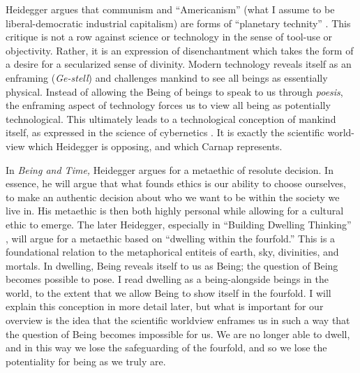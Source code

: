 \documentclass[leqno, 12pt]{turabian-researchpaper}
\begin{document}
	Heidegger argues that communism and \enquote{Americanism} (what I assume to be
	liberal-democratic industrial capitalism) are forms of \enquote{planetary technity}
	\autocite[p206]{heidegger1981}. This critique is not a row against science or technology
	in the sense of tool-use or objectivity. Rather, it is an expression of disenchantment
	which takes the form of a desire for a secularized sense of divinity. Modern
	technology reveals itself as an enframing (\textit{Ge-stell}) and challenges mankind
	to see all beings as essentially physical. Instead of allowing the Being of
	beings to speak to us through \textit{poesis}, the enframing aspect of
	technology forces us to view all being as potentially technological. This ultimately
	leads to a technological conception of mankind itself, as expressed in the
	science of cybernetics \autocite{heidegger2008c}. It is exactly the scientific
	world-view which Heidegger is opposing, and which Carnap represents.

	In \textit{Being and Time,} Heidegger argues for a metaethic of resolute
	decision. In essence, he will argue that what founds ethics is our ability to
	choose ourselves, to make an authentic decision about who we want to be within
	the society we live in. His metaethic is then both highly personal while
	allowing for a cultural ethic to emerge. The later Heidegger, especially in
	\enquote{Building Dwelling Thinking} \autocite{heidegger2008e}, will argue for
	a metaethic based on \enquote{dwelling within the fourfold.} This is a
	foundational relation to the metaphorical entiteis of earth, sky, divinities, and
	mortals. In dwelling, Being reveals itself to us as Being; the question of
	Being becomes possible to pose. I read dwelling as a being-alongside beings in
	the world, to the extent that we allow Being to show itself in the fourfold. I
	will explain this conception in more detail later, but what is important for
	our overview is the idea that the scientific worldview enframes us in such a
	way that the question of Being becomes impossible for us. We are no longer able
	to dwell, and in this way we lose the safeguarding of the fourfold, and so we lose
	the potentiality for being as we truly are.
\end{document}
